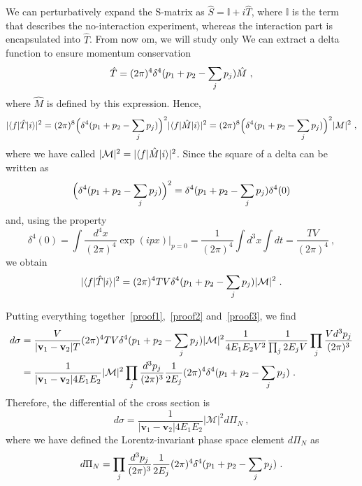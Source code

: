     We can perturbatively expand the S-matrix as $\hat S = \mathbb I + i \hat T$, where $\mathbb I$ is the term that describes the no-interaction experiment, whereas the interaction part is encapsulated into $\hat T$. From now om, we will study only We can extract a delta function to ensure momentum conservation
    \begin{equation*}
        \hat T = (2\pi)^4 \delta^4 (p_1 + p_2 - \small \sum_j p_j) \hat M ~,
    \end{equation*}
    where $\hat M$ is defined by this expression. Hence,
    \begin{equation*}
        |\langle f\vert \hat T \vert i\rangle |^2 = (2\pi)^8 \Big (\delta^4 (p_1 + p_2 - \small \sum_j p_j) \Big )^2 |\langle f\vert \hat M \vert i\rangle |^2 = (2\pi)^8 \Big (\delta^4 (p_1 + p_2 - \small \sum_j p_j) \Big )^2 |M|^2~,
    \end{equation*}
    where we have called $| \mathcal M |^2 = |\langle f\vert \hat M \vert i\rangle |^2$. Since the square of a delta can be written as 
    \begin{equation*}
        \Big (\delta^4 (p_1 + p_2 - \small \sum_j p_j) \Big )^2 = \delta^4 (p_1 + p_2 - \small \sum_j p_j) \delta^4 (0)
    \end{equation*}
    and, using the property 
    \begin{equation*}
        \delta^4 (0) = \int \frac{d^4 x}{(2\pi)^4} \exp(i p x) \Big \vert_{p=0} = \frac{1}{(2\pi)^4} \int d^3 x \int dt = \frac{T V}{(2\pi)^4} ~,
    \end{equation*}
    we obtain
    \begin{equation}\label{proof3}
        |\langle f\vert \hat T \vert i\rangle |^2 = (2\pi)^4 TV \delta^4 (p_1 + p_2 - \small \sum_j p_j) |\mathcal M |^2 ~.
    \end{equation}

    Putting everything together~\eqref{proof1},~\eqref{proof2} and~\eqref{proof3}, we find
    \begin{align*}
        d \sigma & = \frac{V}{|\mathbf v_1 - \mathbf v_2| T} (2\pi)^4 TV \delta^4 (p_1 + p_2 - \small \sum_j p_j) |\mathcal M |^2 \frac{1}{4 E_1 E_2 V^2} \frac{1}{\prod_j 2 E_j V} \prod_j \frac{V d^3 p_j}{(2\pi)^3} \\ & = \frac{1}{|\mathbf v_1 - \mathbf v_2| 4 E_1 E_2} |\mathcal M |^2 \prod_j \frac{d^3 p_j}{(2\pi)^3} \frac{1}{2 E_j} (2\pi)^4 \delta^4 (p_1 + p_2 - \small \sum_j p_j) ~.
    \end{align*}
    Therefore, the differential of the cross section is
    \begin{equation}\label{cross2}
        d \sigma = \frac{1}{|\mathbf v_1 - \mathbf v_2| 4 E_1 E_2} |\mathcal M |^2 d \Pi_N ~,
    \end{equation}
    where we have defined the Lorentz-invariant phase space element $d \Pi_N$ as 
    \begin{equation}\label{cross3}
        d \Pi_N = \prod_j \frac{d^3 p_j}{(2\pi)^3} \frac{1}{2 E_j} (2\pi)^4 \delta^4 (p_1 + p_2 - \small \sum_j p_j) ~.
    \end{equation}

